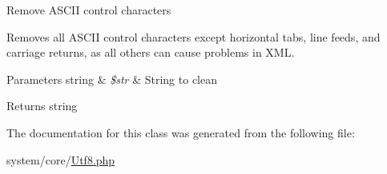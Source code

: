 Remove A\+S\+C\+II control characters

Removes all A\+S\+C\+II control characters except horizontal tabs, line feeds, and carriage returns, as all others can cause problems in X\+ML.


\begin{DoxyParams}[1]{Parameters}
string & {\em \$str} & String to clean \\
\hline
\end{DoxyParams}
\begin{DoxyReturn}{Returns}
string 
\end{DoxyReturn}


The documentation for this class was generated from the following file\+:\begin{DoxyCompactItemize}
\item 
system/core/\mbox{\hyperlink{_utf8_8php}{Utf8.\+php}}\end{DoxyCompactItemize}

